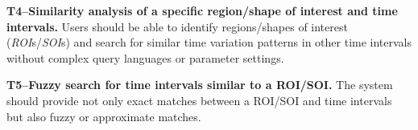 \noindent\textbf{T4--Similarity analysis of a specific region/shape of interest and time intervals.} 
Users should be able to identify regions/shapes of interest (\emph{ROI}s/\emph{SOI}s) and search for similar time variation patterns in other time intervals without complex query languages or parameter settings.

\noindent\textbf{T5--Fuzzy search for time intervals similar to a ROI/SOI.}
The system should provide not only exact matches between a ROI/SOI and time intervals but also fuzzy or approximate matches. 

